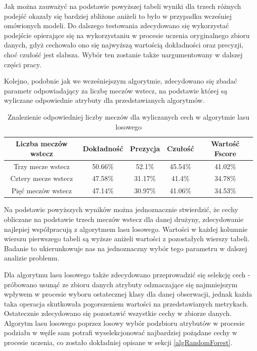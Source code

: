 Jak można zauważyć na podstawie powyższej tabeli wyniki dla trzech różnych podejść okazały się bardziej zbliżone aniżeli to było w przypadku wcześniej omówionych modeli. Do dalszego testowania zdecydowano się wykorzystać podejście opierające się na wykorzystaniu w procesie uczenia oryginalnego zbioru danych, gdyż cechowało ono się najwyższą wartością dokładności oraz precyzji, choć czułość jest slabsza. Wybór ten zostanie także uargumentowany w dalszej części pracy.

Kolejno, podobnie jak we wcześniejszym algorytmie, zdecydowano się zbadać parametr odpowiadający za liczbę meczów wstecz, na podstawie której są wyliczane odpowiednie atrybuty dla przedstawianych algorytmów.

\begin{table}[H]
    \centering
    \caption{Znalezienie odpowiedniej liczby meczów dla wyliczanych cech w algorytmie lasu losowego}
    \begin{tabular}{| c | c | c | c | c |}
    \hline
        Liczba meczów wstecz & Dokładność & Prezycja & Czułość & Wartość Fscore \\ \hline 
        \hline
        Trzy mecze wstecz & 50.66\% & 52.1\% & 45.54\% & 41.02\% \\
        \hline
        Cztery mecze wstecz & 47.58\% & 31.17\% & 41.4\% & 34.78\% \\
        \hline
        Pięć meczów wstecz & 47.14\% & 30.97\% & 41.06\% & 34.53\% \\
         \hline
    \end{tabular}
\end{table}

Na podstawie powyższych wyników można jednoznacznie stwierdzić, że cechy obliczane na podstawie trzech meczów wstecz dla danej drużyny, zdecydowanie najlepiej współpracują z algorytmem lasu losowego. Wartości w każdej kolumnie wierszu pierwszego tabeli są wyższe aniżeli wartości z pozostałych wierszy tabeli. Badanie to ukierunkowuje nas na jednoznaczny wybór tego parametru w dalszej analizie problemu.

Dla algorytmu lasu losowego także zdecydowano przeprowadzić się selekcję cech - próbowano usunąć ze zbioru danych atrybuty odznaczające się najmniejszym wpływem w procesie wyboru ostatecznej klasy dla danej obserwacji, jednak każda taka operacja skutkowała pogorszeniem wartości na przedstawianych metrykach. Ostatecznie zdecydowano się pozostawić wszystkie cechy w zbiorze danych. Algorytm lasu losowego poprzez losowy wybór podzbioru atrybutów w procesie podziału w węźle sam potrafi wyselekcjonować najbardziej pożądane cechy w procesie uczenia, co zostało dokładniej opisane w sekcji \ref{algRandomForest}.

